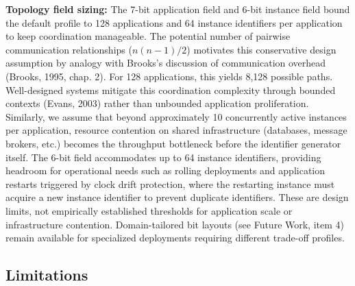 \documentclass[fleqn,10pt,lineno]{wlpeerj}
\begin{document}
\textbf{Topology field sizing:} The 7-bit application field and 6-bit
instance field bound the default profile to 128 applications and 64
instance identifiers per application to keep coordination manageable.
The potential number of pairwise communication relationships
(\(n(n-1)/2\)) motivates this conservative design assumption by analogy
with Brooks's discussion of communication overhead (Brooks, 1995, chap.
2). For 128 applications, this yields 8,128 possible paths.
Well-designed systems mitigate this coordination complexity through
bounded contexts (Evans, 2003) rather than unbounded application
proliferation. Similarly, we assume that beyond approximately 10
concurrently active instances per application, resource contention on
shared infrastructure (databases, message brokers, etc.) becomes the
throughput bottleneck before the identifier generator itself. The 6-bit
field accommodates up to 64 instance identifiers, providing headroom for
operational needs such as rolling deployments and application restarts
triggered by clock drift protection, where the restarting instance must
acquire a new instance identifier to prevent duplicate identifiers.
These are design limits, not empirically established thresholds for
application scale or infrastructure contention. Domain-tailored bit
layouts (see Future Work, item 4) remain available for specialized
deployments requiring different trade-off profiles.

\subsection{Limitations}\label{limitations}
\end{document}
